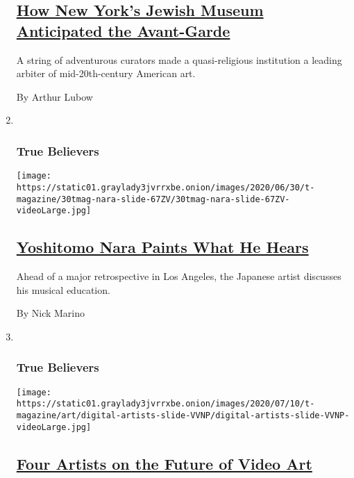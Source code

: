 \begin{enumerate}
  \hypertarget{how-new-yorks-jewish-museum-anticipated-the-avant-garde}{%
  \subsection{\texorpdfstring{\href{/2020/07/23/t-magazine/jewish-museum-new-york.html}{How
  New York's Jewish Museum Anticipated the
  Avant-Garde}}{How New York's Jewish Museum Anticipated the Avant-Garde}}\label{how-new-yorks-jewish-museum-anticipated-the-avant-garde}}

  A string of adventurous curators made a quasi-religious institution a
  leading arbiter of mid-20th-century American art.

  By Arthur Lubow
\item ~
  \hypertarget{true-believers-6}{%
  \subsubsection{True Believers}\label{true-believers-6}}

  \texttt{[image: https://static01.graylady3jvrrxbe.onion/images/2020/06/30/t-magazine/30tmag-nara-slide-67ZV/30tmag-nara-slide-67ZV-videoLarge.jpg]}

  \hypertarget{yoshitomo-nara-paints-what-he-hears}{%
  \subsection{\texorpdfstring{\href{/2020/07/24/t-magazine/yoshitomo-nara.html}{Yoshitomo
  Nara Paints What He
  Hears}}{Yoshitomo Nara Paints What He Hears}}\label{yoshitomo-nara-paints-what-he-hears}}

  Ahead of a major retrospective in Los Angeles, the Japanese artist
  discusses his musical education.

  By Nick Marino
\item ~
  \hypertarget{true-believers-7}{%
  \subsubsection{True Believers}\label{true-believers-7}}

  \texttt{[image: https://static01.graylady3jvrrxbe.onion/images/2020/07/10/t-magazine/art/digital-artists-slide-VVNP/digital-artists-slide-VVNP-videoLarge.jpg]}

  \hypertarget{four-artists-on-the-future-of-video-art}{%
  \subsection{\texorpdfstring{\href{/2020/07/22/t-magazine/video-art.html}{Four
  Artists on the Future of Video
  Art}}{Four Artists on the Future of Video Art}}\label{four-artists-on-the-future-of-video-art}}


\end{enumerate}
